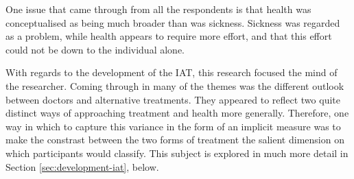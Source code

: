 One issue that came through from all the respondents is that health was conceptualised as being much broader than was sickness. Sickness was regarded as a problem, while health appears to require more effort, and that this effort could not be down to the individual alone. 

With regards to the development of the IAT, this research focused the mind of the researcher. Coming through in many of the themes was the different outlook between doctors and alternative treatments. They appeared to reflect two quite distinct ways of approaching treatment and health more generally. Therefore, one way in which to capture this variance in the form of an implicit measure was to make the constrast between the two forms of treatment the salient dimension on which participants would classify. This subject is explored in much more detail in Section \ref{sec:development-iat}, below. 

